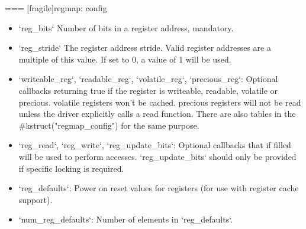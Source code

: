 === [fragile]{regmap: config}
  \begin{itemize}
  \item `reg_bits` Number of bits in a register address, mandatory.
  \item `reg_stride` The register address stride. Valid register
    addresses are a multiple of this value. If set to 0, a value of 1
    will be used.
  \item `writeable_reg`, `readable_reg`,
    `volatile_reg`, `precious_reg`: Optional callbacks
    returning true if the register is writeable, readable, volatile or
    precious. volatile registers won't be cached. precious registers
    will not be read unless the driver explicitly calls a read
    function. There are also tables in the #kstruct("regmap_config")
    for the same purpose.
  \item `reg_read`, `reg_write`, `reg_update_bits`:
    Optional callbacks that if filled will be used to perform
    accesses. `reg_update_bits` should only be provided if
    specific locking is required.
  \item `reg_defaults`: Power on reset values for registers (for
    use with register cache support).
  \item `num_reg_defaults`: Number of elements in
    `reg_defaults`.
  \end{itemize}


